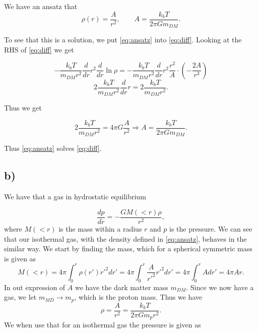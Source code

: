 \documentclass[a4paper,norsk, 10pt]{article}
\begin{document}
We have an ansatz that
\begin{equation}\label{eq:ansatz}
\rho(r) = \dfrac{A}{r^2}, \qquad A = \frac{k_b T}{2\pi Gm_{DM}}.
\end{equation}

To see that this is a solution, we put \eqref{eq:ansatz} into \eqref{eq:diff}. Looking at the RHS of \eqref{eq:diff} we get 


\begin{equation}
-\dfrac{k_b T}{m_{DM} r^2}\dfrac{d}{dr}r^2 \dfrac{d}{dr} \ln \rho = -\dfrac{k_b T}{m_{DM} r^2}\dfrac{d}{dr}r^2 \dfrac{r^2}{A}\cdot \left(-\dfrac{2A}{r^3}\right)
\end{equation}
\begin{equation}
2\dfrac{k_b T}{m_{DM} r^2}\dfrac{d}{dr}r = 2\dfrac{k_b T}{m_{DM} r^2}.
\end{equation}

Thus we get

\begin{equation}
2\dfrac{k_b T}{m_{DM} r^2} = 4\pi G \dfrac{A}{r^2} \Rightarrow A = \dfrac{k_b T}{2\pi G m_{DM} }.
\end{equation}

Thus \eqref{eq:ansatz} solves \eqref{eq:diff}.


\subsection{b)}

We have that a gas in hydrostatic equilibrium 

\begin{equation}\label{eq:dp}
\dfrac{dp}{dr} = - \dfrac{GM(<r)\rho}{r^2},
\end{equation}
where $M(<r)$ is the mass within a radius $r$ and $p$ is the pressure. We can see that our isothermal gas, with the density defined in \eqref{eq:ansatz}, behaves in the similar way. We start by finding the mass, which for a spherical symmetric mass is given as
\begin{equation}\label{eq:mass}
M(<r) = 4\pi \int_0^r \rho(r') r'^2 dr' = 4\pi \int_0^r \dfrac{A}{r'^2} r'^2 dr' = 4\pi \int_0^r A  dr' = 4\pi A r.
\end{equation}
In out expression of $A$ we have the dark matter mass $m_{DM}$. Since we now have a gas, we let $m_{MD} \rightarrow m_p$, which is the proton mass. Thus we have
\begin{equation}
\rho = \dfrac{A}{r^2} = \dfrac{k_b T}{2\pi G m_p r^2}.
\end{equation}
We when use that for an isothermal gas the pressure is given as
\end{document}
